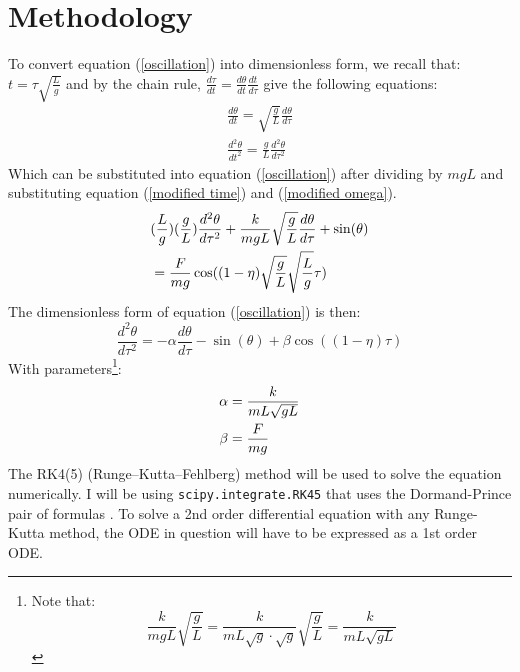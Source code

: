 \documentclass[10pt, twocolumn]{article}
\begin{document}
\section{Methodology}
To convert equation (\ref{oscillation}) into dimensionless form, we recall that: $t = \tau\sqrt{\frac{L}{g}}$  and by the chain rule, $\frac{d\tau}{dt} = \frac{d\theta}{dt}\frac{dt}{d\tau}$ give the following equations:
\begin{equation}
    \begin{split}
        \frac{d\theta}{dt} = \sqrt{\frac{g}{L}}\frac{d\theta}{d\tau} \\
        \frac{d^2\theta}{dt^2} = \frac{g}{L}\frac{d^2\theta}{d\tau^2}
    \end{split}
    \label{chain rules}
\end{equation}
Which can be substituted into equation (\ref{oscillation}) after dividing by $mgL$ and substituting equation (\ref{modified time}) and (\ref{modified omega}).
\begin{equation}
        \centering
        \begin{split}
            & (\frac{L}{g})(\frac{g}{L})\frac{d^2\theta}{d\tau^2} + \frac{k}{mgL}\sqrt{\frac{g}{L}}\frac{d\theta}{d\tau} + \sin(\theta)\\
            & = \frac{F}{mg}\cos((1 - \eta)\sqrt{\frac{g}{L}}\sqrt{\frac{L}{g}}\tau)
        \end{split}    
\end{equation}
The dimensionless form of equation (\ref{oscillation}) is then:
\begin{equation}
    \frac{d^2\theta}{d\tau^2} = -\alpha\frac{d\theta}{d\tau} - \sin(\theta) + \beta\cos((1 - \eta)\tau)
    \label{dimensionless}
\end{equation}
With parameters\footnote{
    Note that:
    \\
        \begin{equation}
            \frac{k}{mgL}\sqrt{\frac{g}{L}} = \frac{k}{mL\sqrt{g}\cdot\sqrt{g}}\sqrt{\frac{g}{L}} = \frac{k}{mL\sqrt{gL}}
        \end{equation}
}: 
\begin{equation}
    \centering
    \begin{split}
        \alpha &= \frac{k}{mL\sqrt{gL}}\\
        \beta &= \frac{F}{mg}
    \end{split}
    \label{parameters}
\end{equation}
The RK4(5) (Runge–Kutta–Fehlberg) method will be used to solve the equation numerically. I will be using \verb|scipy.integrate.RK45| that uses the Dormand-Prince pair of formulas \cite{DormandPrince1980}. To solve a 2nd order differential equation with any Runge-Kutta method, the ODE in question will have to be expressed as a 1st order ODE. 
\end{document}

